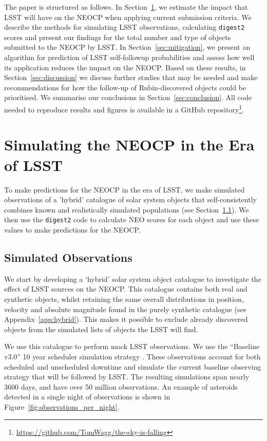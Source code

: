 \documentclass[twocolumn]{aastex631}
\newcommand{\dig}{\texttt{digest2}}
\begin{document}
The paper is structured as follows. In Section~\ref{sec:current_impact}, we estimate the impact that LSST will have on the NEOCP when applying current submission criteria. We describe the methods for simulating LSST observations, calculating \dig{} scores and present our findings for the total number and type of objects submitted to the NEOCP by LSST. In Section~\ref{sec:mitigation}, we present an algorithm for prediction of LSST self-followup probabilities and assess how well its application reduces the impact on the NEOCP. Based on these results, in Section~\ref{sec:discussion} we discuss further studies that may be needed and make recommendations for how the follow-up of Rubin-discovered objects could be prioritised. We summarise our conclusions in Section~\ref{sec:conclusion}. All code needed to reproduce results and figures is available in a GitHub repository\footnote{\url{https://github.com/TomWagg/the-sky-is-falling}}.

\section{Simulating the NEOCP in the Era of LSST}\label{sec:current_impact}
To make predictions for the NEOCP in the era of LSST, we make simulated observations of a 'hybrid' catalogue of solar system objects that self-consistently combines known and realistically simulated populations (see Section~\ref{sec:sim_obs}). We then use the \dig{} code to calculate NEO scores for each object and use these values to make predictions for the NEOCP.

\subsection{Simulated Observations}\label{sec:sim_obs}
We start by developing a `hybrid' solar system object catalogue to investigate the effect of LSST sources on the NEOCP. This catalogue contains both real and synthetic objects, whilst retaining the same overall distributions in position, velocity and absolute magnitude found in the purely synthetic catalogue (see Appendix~\ref{app:hybrid}). This makes it possible to exclude already discovered objects from the simulated lists of objects the LSST will find.

We use this catalogue to perform mock LSST observations. We use the ``Baseline v3.0'' 10 year scheduler simulation strategy \citep{Naghib+2019, Cornwall+2020}. These observations account for both scheduled and unscheduled downtime and simulate the current baseline observing strategy that will be followed by LSST. The resulting simulations span nearly 3600 days, and have over 50 million observations. An example of asteroids detected in a single night of observations is shown in Figure~\ref{fig:observations_per_night}.
\end{document}
